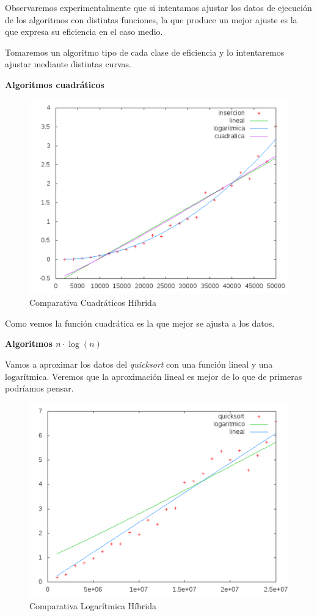 \documentclass[a4paper, 11pt]{article}
\begin{document}
Observaremos experimentalmente que si intentamos ajustar los datos de ejecución de los algoritmos con distintas funciones, la que produce un mejor ajuste es la que expresa su eficiencia en el caso medio.

Tomaremos un algoritmo tipo de cada clase de eficiencia y lo intentaremos ajustar mediante distintas curvas.

\vspace{1cm}
\textbf{Algoritmos cuadráticos}

\begin{figure}[H]\includegraphics[width=13cm]{img/cuad_hibrida.pdf} \centering
	\caption{Comparativa Cuadráticos Híbrida}\end{figure}

Como vemos la función cuadrática es la que mejor se ajusta a los datos.

\vspace{1cm}

\textbf{Algoritmos $n \cdot \log(n)$}

Vamos a aproximar los datos del \textit{quicksort} con una función lineal y una logarítmica. Veremos que la aproximación lineal es mejor de lo que de primeras podríamos pensar.


\begin{figure}[H]\includegraphics[width=13cm]{img/log_hibrida.pdf} \centering
	\caption{Comparativa Logarítmica Híbrida}\end{figure}
\end{document}

